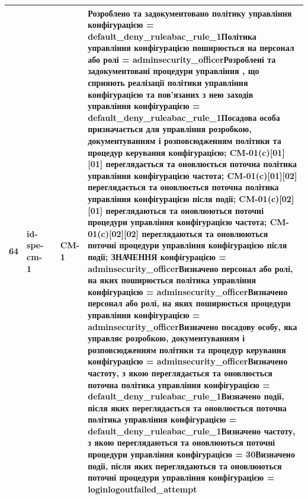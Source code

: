 \documentclass[10pt]{article}
\begin{document}
\begin{longtable}{|c|>{\raggedright\arraybackslash}p{4cm}|>{\raggedright\arraybackslash}p{2.5cm}|>{\raggedright\arraybackslash}p{3.5cm}|>{\raggedright\arraybackslash}p{5.5cm}|}
64 & id-spe-cm-1 &  & CM-1 & Розроблено та задокументовано політику управління конфігурацією = \textbf{default\_\allowbreak{}deny\_\allowbreak{}ruleabac\_\allowbreak{}rule\_\allowbreak{}1}\newline Політика управління конфігурацією поширюється на персонал або ролі = \textbf{adminsecurity\_\allowbreak{}officer}\newline Розроблені та задокументовані процедури управління , що сприяють реалізації політики управління конфігурацією та пов'язаних з нею заходів управління конфігурацією = \textbf{default\_\allowbreak{}deny\_\allowbreak{}ruleabac\_\allowbreak{}rule\_\allowbreak{}1}\newline Посадова особа призначається для управління розробкою, документуванням і розповсюдженням політики та процедур керування конфігурацією; CM-01(c)[01][01] переглядається та оновлюється поточна політика управління конфігурацією частота; CM-01(c)[01][02] переглядається та оновлюється поточна політика управління конфігурацією після події; CM-01(c)[02][01] переглядаються та оновлюються поточні процедури управління конфігурацією частота; CM-01(c)[02][02] переглядаються та оновлюються поточні процедури управління конфігурацією після події; ЗНАЧЕННЯ конфігурацією = \textbf{adminsecurity\_\allowbreak{}officer}\newline Визначено персонал або ролі, на яких поширюється політика управління конфігурацією = \textbf{adminsecurity\_\allowbreak{}officer}\newline Визначено персонал або ролі, на яких поширюється процедури управління конфігурацією = \textbf{adminsecurity\_\allowbreak{}officer}\newline Визначено посадову особу, яка управляє розробкою, документуванням і розповсюдженням політики та процедур керування конфігурацією = \textbf{adminsecurity\_\allowbreak{}officer}\newline Визначено частоту, з якою переглядається та оновлюється поточна політика управління конфігурацією = \textbf{default\_\allowbreak{}deny\_\allowbreak{}ruleabac\_\allowbreak{}rule\_\allowbreak{}1}\newline Визначено події, після яких переглядається та оновлюється поточна політика управління конфігурацією = \textbf{default\_\allowbreak{}deny\_\allowbreak{}ruleabac\_\allowbreak{}rule\_\allowbreak{}1}\newline Визначено частоту, з якою переглядаються та оновлюються поточні процедури управління конфігурацією = \textbf{30}\newline Визначено події, після яких переглядаються та оновлюються поточні процедури управління конфігурацією = \textbf{loginlogoutfailed\_\allowbreak{}attempt} \\ \hline

\end{longtable}
\end{document}
